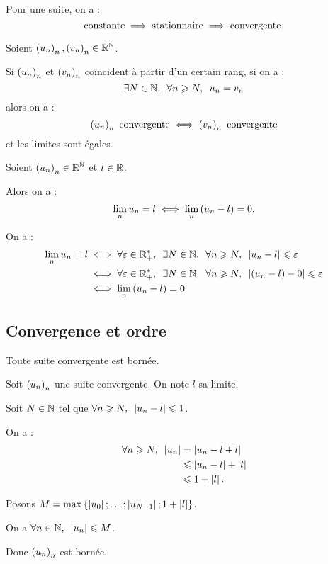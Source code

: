 \begin{rem}
Pour une suite, on a : \[\text{constante}\implies\text{stationnaire}\implies\text{convergente}.\]
\end{rem}

\begin{rem}
Soient \(\left(u_n\right)_n,\left(v_n\right)_n\in\mathbb{R}^{\mathbb{N}}\).

Si \(\left(u_n\right)_n\) et \(\left(v_n\right)_n\) coïncident à partir d'un certain rang, \cad si on a : \[\quantifs{\exists N\in\N;\forall n\geq N}u_n=v_n\] alors on a : \[\left(u_n\right)_n\text{ convergente}\iff\left(v_n\right)_n\text{ convergente}\] et les limites sont égales.
\end{rem}

\begin{prop}
Soient \(\left(u_n\right)_n\in\mathbb{R}^{\mathbb{N}}\) et \(l\in\mathbb{R}\).

Alors on a : \[\lim_nu_n=l\iff\lim_n\left(u_n-l\right)=0.\]
\end{prop}

\begin{dem}
On a : \[\begin{aligned}
\lim_nu_n=l&\ssi\quantifs{\forall\epsilon\in\Rps;\exists N\in\N;\forall n\geq N}\abs{u_n-l}\leq\epsilon \\
&\ssi\quantifs{\forall\epsilon\in\Rps;\exists N\in\N;\forall n\geq N}\abs{\paren{u_n-l}-0}\leq\epsilon \\
&\ssi\lim_n\paren{u_n-l}=0
\end{aligned}\]
\end{dem}

\subsection{Convergence et ordre}

\begin{prop}
Toute suite convergente est bornée.
\end{prop}

\begin{dem}
Soit \(\left(u_n\right)_n\) une suite convergente. On note \(l\) sa limite.

Soit \(N\in\mathbb{N}\) tel que \(\quantifs{\forall n\geq N}\abs{u_n-l}\leq1\).

On a : \[\begin{aligned}
\quantifs{\forall n\geq N}\abs{u_n}&=\abs{u_n-l+l} \\
&\leq\abs{u_n-l}+\abs{l} \\
&\leq1+\abs{l}.
\end{aligned}\]

Posons \(M=\max\left\lbrace\left\lvert u_0\right\rvert;\dots;\left\lvert u_{N-1}\right\rvert;1+\left\lvert l\right\rvert\right\rbrace\).

On a \(\quantifs{\forall n\in\N}\abs{u_n}\leq M\).

Donc \(\left(u_n\right)_n\) est bornée.
\end{dem}

